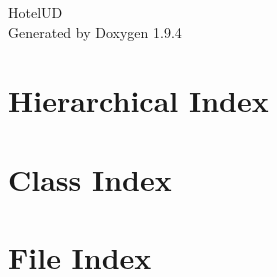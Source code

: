 \documentclass[twoside]{book}
\newcommand{\+}{\discretionary{\mbox{\scriptsize$\hookleftarrow$}}{}{}}
\newcommand{\clearemptydoublepage}{%
    \newpage{\pagestyle{empty}\cleardoublepage}%
  }
\begin{document}
  \raggedbottom
    \hypersetup{pageanchor=false,
                bookmarksnumbered=true,
                pdfencoding=unicode
               }
  \begin{titlepage}
  \vspace*{7cm}
  \begin{center}%
  {\Large Hotel\+UD}\\
  \vspace*{1cm}
  {\large Generated by Doxygen 1.9.4}\\
  \end{center}
  \end{titlepage}
  \clearemptydoublepage
  \tableofcontents
  \clearemptydoublepage
  \hypersetup{pageanchor=true}
\chapter{Hierarchical Index}

\chapter{Class Index}

\chapter{File Index}

\end{document}
